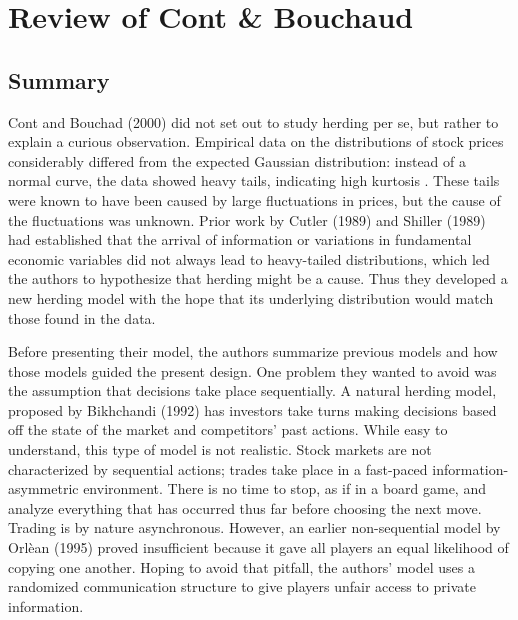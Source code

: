 \documentclass{article}
\begin{document}
\section{Review of Cont \& Bouchaud}
\subsection{Summary}
Cont and Bouchad (2000) did not set out to study herding per se, but rather to explain a curious observation.
Empirical data on the distributions of stock prices considerably differed from the expected Gaussian distribution: instead of a normal curve, the data showed heavy tails, indicating high kurtosis \cite{cont}.
These tails were known to have been caused by large fluctuations in prices, but the cause of the fluctuations was unknown.
Prior work by Cutler (1989) and Shiller (1989) had established that the arrival of information or variations in fundamental economic variables did not always lead to heavy-tailed distributions, which led the authors to hypothesize that herding might be a cause.
Thus they developed a new herding model with the hope that its underlying distribution would match those found in the data.

Before presenting their model, the authors summarize previous models and how those models guided the present design.
One problem they wanted to avoid was the assumption that decisions take place sequentially.
A natural herding model, proposed by Bikhchandi (1992) has investors take turns making decisions based off the state of the market and competitors' past actions.
While easy to understand, this type of model is not realistic. 
Stock markets are not characterized by sequential actions; trades take place in a fast-paced information-asymmetric environment. 
There is no time to stop, as if in a board game, and analyze everything that has occurred thus far before choosing the next move. 
Trading is by nature asynchronous.
However, an earlier non-sequential model by Orl\`{e}an (1995) proved insufficient because it gave all players an equal likelihood of copying one another.
Hoping to avoid that pitfall, the authors' model uses a randomized communication structure to give players unfair access to private information.
\end{document}
